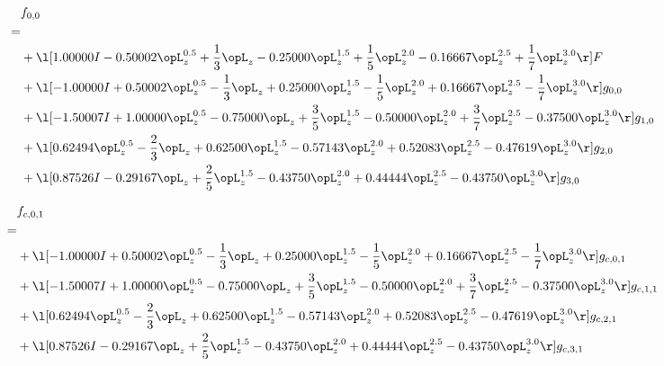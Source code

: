 \begin{alignat}{2} 
\label{eq:f_00_0} 
& f_{0,0} \nonumber \\ 
 = \\ 
& + \l[  1.00000 I   -0.50002 \opL_z^{0.5} + \frac{1}{3} \opL_z   -0.25000 \opL_z^{1.5} + \frac{1}{5} \opL_z^{2.0}   -0.16667 \opL_z^{2.5} + \frac{1}{7} \opL_z^{3.0}  \r] F \nonumber \\ 
& + \l[  -1.00000 I +  0.50002 \opL_z^{0.5} - \frac{1}{3} \opL_z +  0.25000 \opL_z^{1.5} - \frac{1}{5} \opL_z^{2.0} +  0.16667 \opL_z^{2.5} - \frac{1}{7} \opL_z^{3.0}  \r] g_{0,0} \nonumber \\ 
& + \l[  -1.50007 I +  1.00000 \opL_z^{0.5}   -0.75000 \opL_z + \frac{3}{5} \opL_z^{1.5}   -0.50000 \opL_z^{2.0} + \frac{3}{7} \opL_z^{2.5}   -0.37500 \opL_z^{3.0}  \r] g_{1,0} \nonumber \\ 
& + \l[  0.62494 \opL_z^{0.5} - \frac{2}{3} \opL_z +  0.62500 \opL_z^{1.5}   -0.57143 \opL_z^{2.0} +  0.52083 \opL_z^{2.5}   -0.47619 \opL_z^{3.0}  \r] g_{2,0} \nonumber \\ 
& + \l[  0.87526 I   -0.29167 \opL_z + \frac{2}{5} \opL_z^{1.5}   -0.43750 \opL_z^{2.0} +  0.44444 \opL_z^{2.5}   -0.43750 \opL_z^{3.0}  \r] g_{3,0} \nonumber \\ 
\end{alignat} 


\begin{alignat}{2} 
\label{eq:f_01_0} 
& f_{c,0,1} \nonumber \\ 
 = \\ 
& + \l[  -1.00000 I +  0.50002 \opL_z^{0.5} - \frac{1}{3} \opL_z +  0.25000 \opL_z^{1.5} - \frac{1}{5} \opL_z^{2.0} +  0.16667 \opL_z^{2.5} - \frac{1}{7} \opL_z^{3.0}  \r] g_{c,0,1} \nonumber \\ 
& + \l[  -1.50007 I +  1.00000 \opL_z^{0.5}   -0.75000 \opL_z + \frac{3}{5} \opL_z^{1.5}   -0.50000 \opL_z^{2.0} + \frac{3}{7} \opL_z^{2.5}   -0.37500 \opL_z^{3.0}  \r] g_{c,1,1} \nonumber \\ 
& + \l[  0.62494 \opL_z^{0.5} - \frac{2}{3} \opL_z +  0.62500 \opL_z^{1.5}   -0.57143 \opL_z^{2.0} +  0.52083 \opL_z^{2.5}   -0.47619 \opL_z^{3.0}  \r] g_{c,2,1} \nonumber \\ 
& + \l[  0.87526 I   -0.29167 \opL_z + \frac{2}{5} \opL_z^{1.5}   -0.43750 \opL_z^{2.0} +  0.44444 \opL_z^{2.5}   -0.43750 \opL_z^{3.0}  \r] g_{c,3,1} \nonumber \\ 
\end{alignat} 


